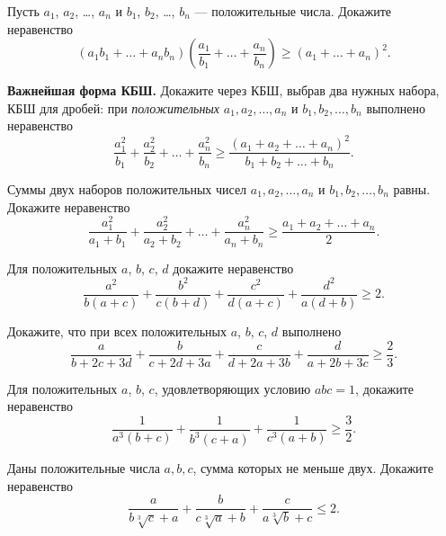 \documentclass{article}
\begin{document}
    \begin{enumerate_boxed}

        \item Пусть $a_1$, $a_2$, \dots, $a_n$ и $b_1$, $b_2$, \dots, $b_n$ ---
        положительные числа.
        Докажите неравенство
        \[ \left(a_1 b_1 +\ldots + a_n b_n \right) \left( \frac{a_1}{b_1} + \ldots + \frac{a_n}{b_n} \right) \geqslant
        \left( a_1+\ldots+a_n \right)^2 .\]

        \item \textbf{Важнейшая форма КБШ.} Докажите через КБШ, выбрав два нужных набора, КБШ для дробей: при \textit{положительных} $a_1, a_2, \ldots, a_n$ и $b_1, b_2, \ldots, b_n$ выполнено неравенство
        \[
            \frac{a_1^2}{b_1}+\frac{a_2^2}{b_2}+\ldots+\frac{a_n^2}{b_n} \geqslant \frac{(a_1+a_2+\ldots+a_n)^2}{b_1+b_2+\ldots+b_n}.
        \]

        \item Суммы двух наборов положительных чисел $a_1, a_2, \ldots, a_n$ и $b_1, b_2, \ldots, b_n$ равны.
        Докажите неравенство
        \[
            \frac{a_1^2}{a_1+b_1}+\frac{a_2^2}{a_2+b_2}+\ldots+\frac{a_n^2}{a_n+b_n} \geqslant \frac{a_1+a_2+\ldots+a_n}{2}.
        \]

        \item Для положительных $a$, $b$, $c$, $d$ докажите неравенство
        \[
            \frac{a^2}{b(a+c)} + \frac{b^2}{c(b+d)} +
            \frac{c^2}{d(a+c)} + \frac{d^2}{a(d+b)} \geqslant 2.
        \]

        \item Докажите, что при всех положительных $a$, $b$, $c$, $d$ выполнено
        \[
            \frac{a}{b+2c+3d} + \frac{b}{c+2d+3a} + \frac{c}{d+2a+3b} +
            \frac{d}{a+2b+3c} \geqslant \frac{2}{3}.
        \]


        \item Для положительных $a$, $b$, $c$, удовлетворяющих условию $abc=1$, докажите неравенство
        \[
            \frac{1}{a^3(b+c)}+\frac{1}{b^3(c+a)}+\frac{1}{c^3(a+b)} \geqslant \frac{3}{2}.
        \]

        \item Даны положительные числа  $a,b,c$, сумма которых не меньше двух.
        Докажите неравенство
        \[\frac{a}{b\sqrt [3] {c}+a}+\frac{b}{c\sqrt [3] {a}+b}+\frac{c}{a\sqrt [3] {b}+c}\leqslant 2.\]

    \end{enumerate_boxed}
\end{document}
